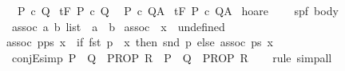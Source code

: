 \begin{isabellebody}
\isanewline
{}\isamarkupfalse%
\ {\isachardoublequoteopen}{\isasymGamma}{\isacharcomma}{\isasymTheta}{\isasymturnstile}\ P\ c\ Q{\isachardoublequoteclose}\isanewline
{}\isamarkupfalse%
\ {\isachardoublequoteopen}{\isasymGamma}{\isacharcomma}{\isasymTheta}{\isasymturnstile}\isactrlsub t\isactrlbsub {\isacharslash}F\isactrlesub \ P\ c\ Q{\isachardoublequoteclose}\isanewline
\isanewline
{}\isamarkupfalse%
\ {\isachardoublequoteopen}{\isasymGamma}{\isacharcomma}{\isasymTheta}{\isasymturnstile}\ P\ c\ Q{\isacharcomma}A{\isachardoublequoteclose}\isanewline
{}\isamarkupfalse%
\ {\isachardoublequoteopen}{\isasymGamma}{\isacharcomma}{\isasymTheta}{\isasymturnstile}\isactrlsub t\isactrlbsub {\isacharslash}F\isactrlesub \ P\ c\ Q{\isacharcomma}A{\isachardoublequoteclose}\isanewline
\isanewline
\isanewline
{}\isamarkupfalse%
\ hoare\ {\isacharequal}\isanewline
\ \ \ {\isasymGamma}{\isacharcolon}{\isacharcolon}{\isachardoublequoteopen}{\isacharparenleft}{\isacharprime}s{\isacharcomma}{\isacharprime}p{\isacharcomma}{\isacharprime}f{\isacharparenright}\ body{\isachardoublequoteclose}\ \isanewline
\isanewline
\isanewline
{}\isamarkupfalse%
\ assoc{\isacharcolon}{\isacharcolon}\ {\isachardoublequoteopen}{\isacharparenleft}{\isacharprime}a\ {\isasymtimes}{\isacharprime}b{\isacharparenright}\ list\ {\isasymRightarrow}\ {\isacharprime}a\ {\isasymRightarrow}\ {\isacharprime}b\ {\isachardoublequoteclose}\isanewline
{}\isanewline
{\isachardoublequoteopen}assoc\ {\isacharbrackleft}{\isacharbrackright}\ x\ {\isacharequal}\ undefined{\isachardoublequoteclose}\ {\isacharbar}\isanewline
{\isachardoublequoteopen}assoc\ {\isacharparenleft}p{\isacharhash}ps{\isacharparenright}\ x\ {\isacharequal}\ {\isacharparenleft}if\ fst\ p\ {\isacharequal}\ x\ then\ {\isacharparenleft}snd\ p{\isacharparenright}\ else\ assoc\ ps\ x{\isacharparenright}{\isachardoublequoteclose}\isanewline
\isanewline
{}\isamarkupfalse%
\ conjE{\isacharunderscore}simp{\isacharcolon}\ {\isachardoublequoteopen}{\isacharparenleft}P\ {\isasymand}\ Q\ {\isasymLongrightarrow}\ PROP\ R{\isacharparenright}\ {\isasymequiv}\ {\isacharparenleft}P\ {\isasymLongrightarrow}\ Q\ {\isasymLongrightarrow}\ PROP\ R{\isacharparenright}{\isachardoublequoteclose}\isanewline
%
\isadelimproof
\ \ %
\endisadelimproof
%
\isatagproof
{}\isamarkupfalse%
\ rule\ simp{\isacharunderscore}all%
\endisatagproof
{\isafoldproof}%
%
\isadelimproof
\isanewline
%
\endisadelimproof
\isanewline
{}\isamarkupfalse%

\end{isabellebody}
